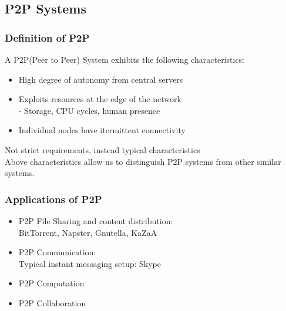 \subsection{P2P Systems}

\begin{frame}
    \frametitle{Definition of P2P}
    A P2P(Peer to Peer) System exhibits the following characteristics:
    \begin{itemize}
        \item High degree of \alert{autonomy} from central servers
        \item Exploits resources at the \alert{edge} of the network \\
            - Storage, CPU cycles, human presence
        \item Individual nodes have \alert{itermittent connectivity}
    \end{itemize}
    Not strict requirements, instead \alert{typical characteristics} \\
    Above characteristics allow us to distinguish P2P systems from other similar systems.
\end{frame}

\begin{frame}
    \frametitle{Applications of P2P}
    \begin{itemize}
        \item P2P File Sharing and content distribution: \\
            BitTorrent, Napster, Gnutella, KaZaA
        \item P2P Communication: \\
            Typical instant messaging setup: Skype
        \item P2P Computation \\
        \item P2P Collaboration
    \end{itemize}
\end{frame}

